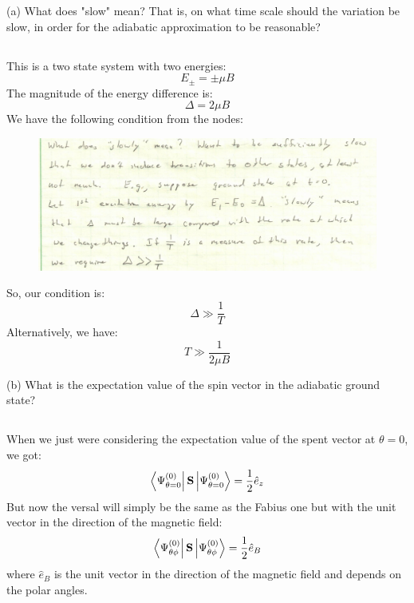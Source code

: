 \documentclass[12pt]{article}
\begin{document}
(a) What does "slow" mean? That is, on what time scale should the variation be slow, in order for the adiabatic approximation to be reasonable?
\subsection{}
This is a two state system with two energies:
\begin{equation}
  E_{\pm}=\pm \mu B
\end{equation}
The magnitude of the energy difference is:
\begin{equation}
  \Delta = 2\mu B
\end{equation}
We have the following condition from the nodes:
\begin{figure}
  \centering
  \includegraphics[scale=0.5]{adiabatic.png}
\end{figure}
So, our condition is:
\begin{equation}
  \Delta  \gg \frac{1}{T}
\end{equation}
Alternatively, we have:
\begin{equation}
  T \gg \frac{1}{2\mu B}
\end{equation}

(b) What is the expectation value of the spin vector in the adiabatic ground state?
\subsection{}
When we just were considering the expectation value of the spent vector at $\theta = 0$, we got:
\begin{equation}
  \bra{\Psi _{\theta =0}^{(0)}}\mathbf{S}\ket{\Psi _{\theta =0}^{(0)}} = \frac{1}{2}\hat{e}_{z}
\end{equation}
But now the versal will simply be the same as the Fabius one but with the unit vector in the direction of the magnetic field:
\begin{equation}
  \bra{\Psi _{\theta \phi}^{(0)}}\mathbf{S}\ket{\Psi _{\theta \phi}^{(0)}} = \frac{1}{2}\hat{e}_{B}
\end{equation}
where $\hat{e}_{B}$ is the unit vector in the direction of the magnetic field and depends on the polar angles.
\end{document}
